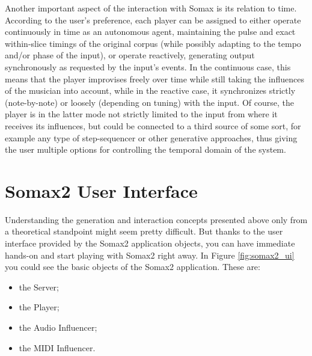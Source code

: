 Another important aspect of the interaction with Somax is its relation to time. According to the user's preference, each player can be assigned to either operate continuously in time as an autonomous agent, maintaining the pulse and exact within-slice timings of the original corpus (while possibly adapting to the tempo and/or phase of the input), or operate reactively, generating output synchronously as requested by the input's events. In the continuous case, this means that the player improvises freely over time while still taking the influences of the musician into account, while in the reactive case, it synchronizes strictly (note-by-note) or loosely (depending on tuning) with the input. Of course, the player is in the latter mode not strictly limited to the input from where it receives its influences, but could be connected to a third source of some sort, for example any type of step-sequencer or other generative approaches, thus giving the user multiple options for controlling the temporal domain of the system.

\section{Somax2 User Interface}

Understanding the generation and interaction concepts presented above only from a theoretical standpoint might seem pretty difficult. But thanks to the user interface provided by the Somax2 application objects, you can have immediate hands-on and start playing with Somax2 right away.
In Figure \ref{fig:somax2_ui} you could see the basic objects of the Somax2 application. These are:
\begin{itemize}
    \item the Server;
    \item the Player;
    \item the Audio Influencer;
    \item the MIDI Influencer.
\end{itemize}





